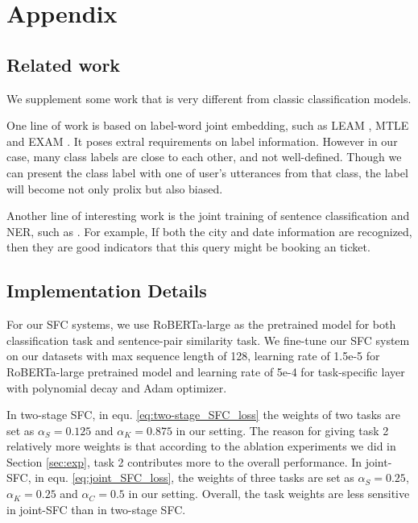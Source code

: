 \newpage

\appendix

\section{Appendix}
\subsection{Related work}
We supplement some work that is very different from classic classification models.

One  line  of  work  is  based  on  label-word  joint  embedding,  such  as LEAM
\cite{wang2018joint}, MTLE \cite{zhang2017multi} and EXAM \cite{du2019explicit}.
It  poses  extral  requirements  on label information. However in our case, many
class  labels  are  close  to  each  other,  and not well-defined. Though we can
present the class label with one of user's utterances from that class, the label
will  become  not  only prolix but also biased.

Another   line   of   interesting   work  is  the  joint  training  of  sentence
classification     and     NER,     such    as    
\cite{kruengkrai2020improving,zhang2020graph,hakkani2016multi,liu2016attention,goo2018slot}.  
For  example,  If  both  the  city and date information are
recognized,  then  they  are good indicators that this query might be booking an
ticket. 

\subsection{Implementation Details}
For  our  SFC  systems,  we  use RoBERTa-large as the pretrained model for both
classification  task  and  sentence-pair similarity task. We fine-tune
our  SFC  system  on  our datasets with max sequence length of 128,
learning  rate  of 1.5e-5 for RoBERTa-large pretrained model and learning rate
of  5e-4  for  task-specific  layer  with polynomial decay and Adam optimizer.

In two-stage SFC, in equ. \ref{eq:two-stage_SFC_loss} the weights of two tasks
are  set  as  $\alpha_S=0.125$ and $\alpha_K=0.875$ in our setting. The reason
for  giving  task  2 relatively more weights is that according to the ablation
experiments  we  did  in Section \ref{sec:exp}, task 2 contributes more to the
overall  performance.  In  joint-SFC,  in  equ.  \ref{eq:joint_SFC_loss}, the
weights  of  three  tasks  are  set  as  $\alpha_S=0.25$,  $\alpha_K=0.25$ and
$\alpha_C=0.5$  in  our setting. Overall, the task weights are less sensitive
in joint-SFC than in two-stage SFC.

